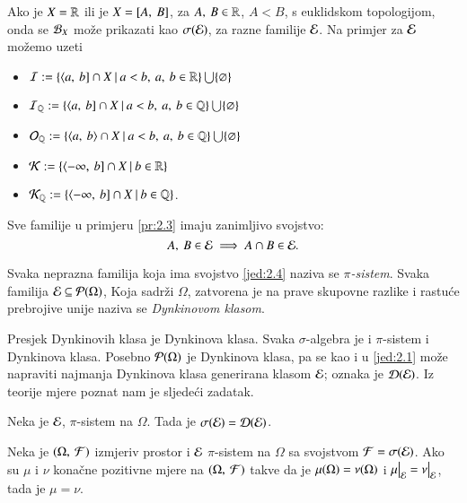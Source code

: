 \begin{pr}  \label{pr:2.3}
    Ako je $X = \mathbb{R}$ ili je $X = [{A}, \:{B}]$, za $A, \: B \in \mathbb{R}$,
    $A < B$, s euklidskom topologijom, onda se $\mathcal{B}_{X}$ mo\v ze
    prikazati kao $\sigma({\mathcal{E}})$, za razne familije $\mathcal{E}$.
    Na primjer za $\mathcal{E}$ mo\v zemo uzeti
    \begin{itemize}
        \item $\mathcal{I} := \{{\langle {a}, \: {b}] \cap X} \: | \: {a < b, \:
            a, \: b \in \mathbb{R}}\} \bigcup \{\varnothing\}$
        \item $\mathcal{I}_{\mathbb{Q}} := \{{\langle {a}, \: {b}] \cap X} \: | \: {a < b,
            \: a, \: b \in \mathbb{Q}}\} \bigcup \{ \varnothing \}$
        \item $\mathcal{O}_{\mathbb{Q}} := \{{\langle {a}, \: {b} \rangle \cap X} \: | \: {a < b,
            \: a, \: b \in \mathbb{Q}}\} \bigcup \{ \varnothing \}$
        \item $\mathcal{K} := \{{\langle {-\infty}, \: {b}] \cap X} \: | \: {b
            \in \mathbb{R}}\}$
        \item $\mathcal{K}_{\mathbb{Q}} := \{{\langle {-\infty}, \: {b}]
            \cap X} \: | \: {b \in \mathbb{Q}}\}$.
    \end{itemize}
\end{pr}

Sve familije u primjeru \ref{pr:2.3} imaju zanimljivo svojstvo:
\begin{equation}    \label{jed:2.4}
    A, \: B \in \mathcal{E} \implies A \cap B \in \mathcal{E}.
\end{equation}

Svaka neprazna familija koja ima svojstvo \eqref{jed:2.4} naziva se
\emph{$\pi$-sistem}. Svaka familija $\mathcal{E} \subseteq \mathcal{P}({\Omega})$,
Koja sadr\v zi $\Omega$, zatvorena je na prave skupovne razlike i
rastu\' ce prebrojive unije naziva se \emph{Dynkinovom klasom}.

Presjek Dynkinovih klasa je Dynkinova klasa. Svaka $\sigma$-algebra
je i $\pi$-sistem i Dynkinova klasa. Posebno $\mathcal{P}({\Omega})$
je Dynkinova klasa, pa se kao i u \eqref{jed:2.1} mo\v ze napraviti
najmanja Dynkinova klasa generirana klasom $\mathcal{E}$; oznaka je
$\mathcal{D}({\mathcal{E}})$. Iz teorije mjere poznat nam je sljede\' ci zadatak.

\begin{zad}   \label{zad:2.5}
    Neka je $\mathcal{E}$, $\pi$-sistem na $\Omega$.
    Tada je $\sigma({\mathcal{E}}) = \mathcal{D}({\mathcal{E}})$.    
\end{zad}

%
%

\begin{tm}  \label{tm:2.6}
    Neka je $(\Omega, \: \mathcal{F})$ izmjeriv prostor i $\mathcal{E}$ $\pi$-sistem
    na $\Omega$ sa svojstvom $\mathcal{F} = \sigma({\mathcal{E}})$.
    Ako su $\mu$ i $\nu$ kona\v cne pozitivne mjere na
    $(\Omega, \: \mathcal{F})$ takve da je $\mu({\Omega})
    = \nu(\Omega)$ i $\restr{\mu}{\E} = \restr{\nu}{\E}$, tada je
    $\mu = \nu$.   
\end{tm}

